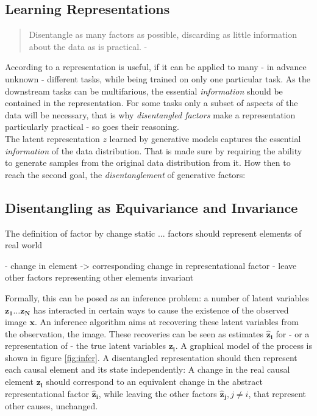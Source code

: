 	\subsection{Learning Representations}

	\begin{quote}
		{Disentangle as many factors as possible, discarding as little information about the data as is practical.} - \cite{Bengio2013rep} %
	\end{quote}

	According to \cite{Bengio2013rep} a representation is useful, if it can be applied to many - in advance unknown - different tasks, while being trained on only one particular task.
	As the downstream tasks can be multifarious, the essential \textit{information} should be contained in the representation.
	For some tasks only a subset of aspects of the data will be necessary, that is why \textit{disentangled factors} make a representation particularly practical - so goes their reasoning.\\
	The latent representation $z$ learned by generative models captures the essential \textit{information} of the data distribution. That is made sure by requiring the ability to generate samples from the original data distribution from it.
	How then to reach the second goal, the \textit{disentanglement} of generative factors:

	\subsection{Disentangling as Equivariance and Invariance}
		The
		definition of factor by change static ...
		factors should represent elements of real world

		- change in element -> corresponding change in representational factor
		- leave other factors representing other elements invariant

		Formally, this can be posed as an inference problem: a number of latent variables $\mathbf{z_1}\ldots\mathbf{z_N}$ has interacted in certain ways to cause the existence of the observed image $\mathbf{x}$. An inference algorithm aims at recovering these latent variables from the observation, \ie the image. These recoveries can be seen as estimates $\mathbf{\hat z_i}$ for - or a representation of - the true latent variables $\mathbf{z_i}$. A graphical model of the process is shown in figure \ref{fig:infer}.
		A disentangled representation should then represent each causal element and its state independently: A change in the real causal element $\mathbf{z_i}$ should correspond to an equivalent change in the abstract representational factor $\mathbf{\hat z_i}$, while leaving the other factors $\mathbf{\hat z_j}, j\neq i$, that represent other causes, unchanged.


